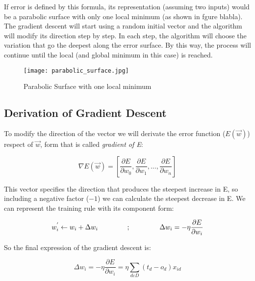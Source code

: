 	If error is defined by this formula, its representation (assuming two inputs) would be a parabolic surface with only one local minimum (as shown in fgure blabla). The gradient descent will start using a random initial vector and the algorithm will modify its direction step by step. In each step, the algorithm will choose the variation that go the deepest along the error surface. By this way, the process will continue until the local (and global minimum in this case) is reached.

	\begin{figure}[ht]
		\centering
		\texttt{[image: parabolic\_surface.jpg]}
		\caption{Parabolic Surface with one local minimum}
		\label{fig:parabolic_surf}
	\end{figure}

	\subsection{Derivation of Gradient Descent}
	To modify the direction of the vector we will derivate the error function ($E(\vec{w})$) respect of $\vec{w}$, form that is called \textit{gradient of E}:

	\begin{equation}
		\label{gradient_of_E}
		\nabla E(\vec{w})= [\frac{\partial{E}}{\partial{w_{0}}}, \frac{\partial{E}}{\partial{w_{1}}}, ..., \frac{\partial{E}}{\partial{w_{n}}}]
	\end{equation}

	This vector specifies the direction that produces the steepest increase in E, so including a negative factor ($-1$) we can calculate the steepest decrease in E. We can represent the training rule with its component form:

	\begin{equation}
		\label{training_rule_component_form}
		w_{i}^{'} \leftarrow w_{i} + \Delta w_{i} \hspace{1.5cm} ; \hspace{1.5cm} \Delta{w_{i}}=-\eta \frac{\partial{E}}{\partial{w_i}}
	\end{equation}

	So the final expression of the gradient descent is:

	\begin{equation}
		\label{gradient_descent_final_expr}
		\Delta w_i = -\eta \frac{\partial{E}}{\partial{w_i}} = \eta \sum_{d \varepsilon D} (t_d - o_d) x_{id}
	\end{equation}


